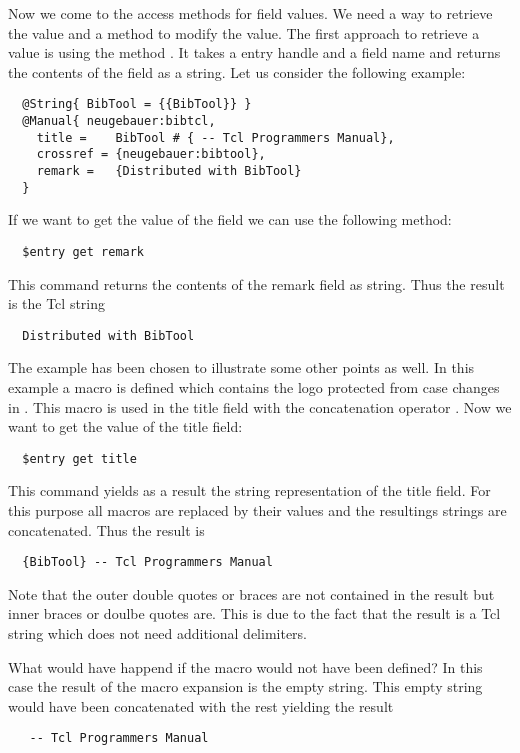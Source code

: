Now we come to the access methods for field values. We need a way to
retrieve the value and a method to modify the value. The first
approach to retrieve a value is using the method .
It takes a entry handle and a field name and returns the contents of
the field as a string. Let us consider the following example:
\begin{verbatim}
  @String{ BibTool = {{BibTool}} }
  @Manual{ neugebauer:bibtcl,
    title =    BibTool # { -- Tcl Programmers Manual},
    crossref = {neugebauer:bibtool},
    remark =   {Distributed with BibTool}
  }
\end{verbatim}
If we want to get the value of the  field we can use the
following method:
\begin{verbatim}
  $entry get remark
\end{verbatim}%
This command returns the contents of the remark field as string. Thus
the result is the Tcl string
\begin{verbatim}
  Distributed with BibTool
\end{verbatim}
The example has been chosen to illustrate some other points as well.
In this example a \BibTeX{} macro  is defined which
contains the \BibTool{} logo protected from case changes in \BibTeX.
This macro is used in the title field with the concatenation operator
\code{\#}. Now we want to get the value of the title field:
\begin{verbatim}
  $entry get title
\end{verbatim}%
This command yields as a result the string representation of the title
field. For this purpose all macros are replaced by their values and
the resultings strings are concatenated. Thus the result is
\begin{verbatim}
  {BibTool} -- Tcl Programmers Manual
\end{verbatim}
Note that the outer double quotes or braces are not contained in the
result but inner braces or doulbe quotes are. This is due to the fact
that the result is a Tcl string which does not need additional
delimiters. 

What would have happend if the macro  would not have
been defined? In this case the result of the macro expansion is the
empty string. This empty string would have been concatenated with the
rest yielding the result
\begin{verbatim}
   -- Tcl Programmers Manual
\end{verbatim}

